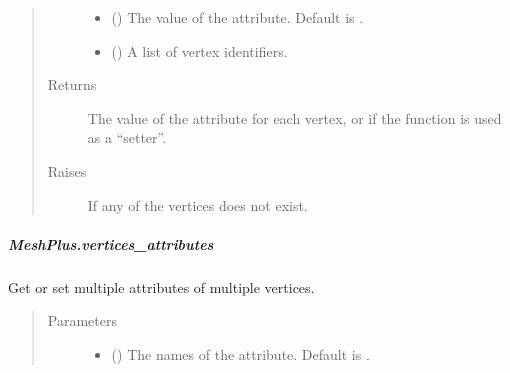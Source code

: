 \documentclass[letterpaper,10pt,english]{sphinxmanual}
\begin{document}
\begin{fulllineitems}
\begin{fulllineitems}
\begin{quote}
\begin{description}
\begin{itemize}
\item {} 
 () \textendash{} The value of the attribute.
Default is .

\item {} 
 () \textendash{} A list of vertex identifiers.

\end{itemize}

\item[{Returns}] \leavevmode
{} \textendash{} The value of the attribute for each vertex,
or  if the function is used as a “setter”.

\item[{Raises}] \leavevmode
{} \textendash{} If any of the vertices does not exist.

\end{description}\end{quote}

\end{fulllineitems}



\subparagraph{MeshPlus.vertices\_attributes}
\label{\detokenize{api/generated/directional_clustering.mesh.MeshPlus.vertices_attributes:meshplus-vertices-attributes}}\label{\detokenize{api/generated/directional_clustering.mesh.MeshPlus.vertices_attributes::doc}}

\begin{fulllineitems}
\label{\detokenize{api/generated/directional_clustering.mesh.MeshPlus.vertices_attributes:directional_clustering.mesh.MeshPlus.vertices_attributes}}
Get or set multiple attributes of multiple vertices.
\begin{quote}\begin{description}
\item[{Parameters}] \leavevmode\begin{itemize}
\item {} 
 () \textendash{} The names of the attribute.
Default is .


\end{itemize}
\end{description}
\end{quote}
\end{fulllineitems}
\end{fulllineitems}
\end{document}

